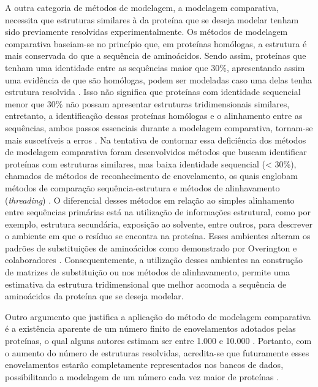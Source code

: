 A outra categoria de métodos de modelagem, a modelagem comparativa, necessita que estruturas similares à da proteína que se deseja modelar tenham sido previamente resolvidas experimentalmente. Os métodos de modelagem comparativa baseiam-se no princípio que, em proteínas homólogas, a estrutura é mais conservada do que a sequência de aminoácidos. Sendo assim, proteínas que tenham uma identidade entre as sequências maior que 30\%, apresentando assim uma evidência de que são homólogas, podem ser modeladas caso uma delas tenha estrutura resolvida \cite{Marti-Renom:1995}. Isso não significa que proteínas com identidade sequencial menor que 30\% não possam apresentar estruturas tridimensionais similares, entretanto, a identificação dessas proteínas homólogas e o alinhamento entre as sequências, ambos passos essenciais durante a modelagem comparativa, tornam-se mais suscetíveis a erros \cite{Marti-Renom:1995}. Na tentativa de contornar essa deficiência dos métodos de modelagem comparativa foram desenvolvidos métodos que buscam identificar proteínas com estruturas similares, mas baixa identidade sequencial (< 30\%), chamados de métodos de reconhecimento de enovelamento, os quais englobam métodos de comparação sequência-estrutura e métodos de alinhavamento (\textit{threading}) \cite{Dunbrack:2001}. O diferencial desses métodos em relação ao simples alinhamento entre sequências primárias está na utilização de informações estrutural, como por exemplo, estrutura secundária, exposição ao solvente, entre outros, para descrever o ambiente em que o resíduo se encontra na proteína. Esses ambientes alteram os padrões de substituições de aminoácidos como demonstrado por Overington e colaboradores \cite{Overington:1984}. Consequentemente, a utilização desses ambientes na construção de matrizes de substituição ou nos métodos de alinhavamento, permite uma estimativa da estrutura tridimensional que melhor acomoda a sequência de aminoácidos da proteína que se deseja modelar.

Outro argumento que justifica a aplicação do método de modelagem comparativa é a existência aparente de um número finito de enovelamentos adotados pelas proteínas, o qual alguns autores estimam ser entre 1.000 e 10.000 \cite{Chothia:1987, Coulson:1997}. Portanto, com o aumento do número de estruturas resolvidas, acredita-se que futuramente esses enovelamentos estarão completamente representados nos bancos de dados, possibilitando a modelagem de um número cada vez maior de proteínas \cite{Kolodny:2008}.

